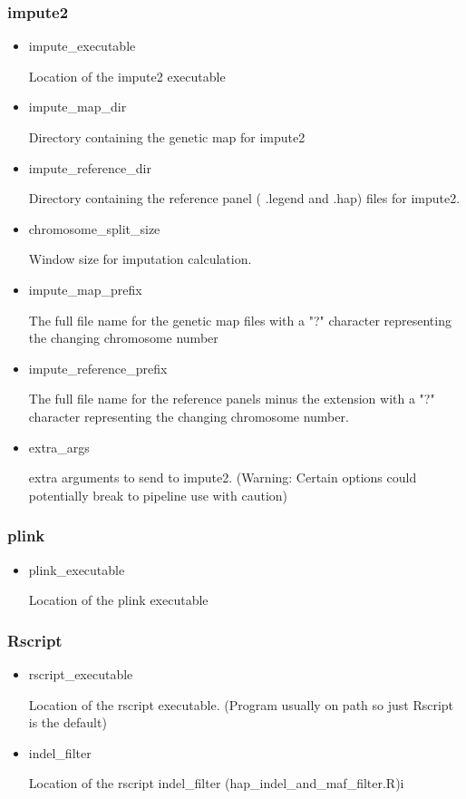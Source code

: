 \documentclass[a4paper,10pt]{article}
\begin{document}
\subsubsection{impute2}
\begin{itemize}
\item impute\_executable 

Location of the impute2 executable
\item impute\_map\_dir

Directory containing the genetic map for impute2
\item impute\_reference\_dir 

Directory containing the reference panel ( .legend and .hap) files for impute2.
\item chromosome\_split\_size

Window size for imputation calculation.
\item impute\_map\_prefix

The full file name for the genetic map files with a "?" character representing the changing chromosome number
\item impute\_reference\_prefix

The full file name for the reference panels minus the extension with a "?" character representing the changing chromosome number.
\item extra\_args

 extra arguments to send to impute2. (Warning: Certain options could potentially break to pipeline use with caution)
\end{itemize}
\subsubsection{plink}
\begin{itemize}
\item plink\_executable 

Location of the plink executable
\end{itemize}
\subsubsection{Rscript}
\begin{itemize}
\item rscript\_executable

Location of the rscript executable. (Program usually on path so just Rscript is the default)
\item indel\_filter

Location of the rscript indel\_filter (hap\_indel\_and\_maf\_filter.R)i
\end{itemize}
\end{document}
